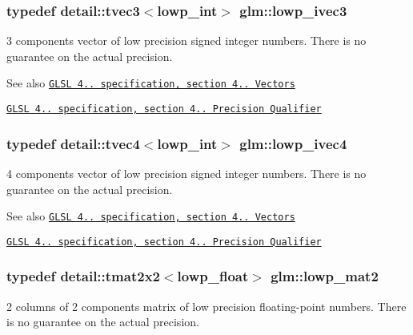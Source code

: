 \subsubsection[{lowp\+\_\+ivec3}]{\setlength{\rightskip}{0pt plus 5cm}typedef detail\+::tvec3$<$lowp\+\_\+int$>$ {\bf glm\+::lowp\+\_\+ivec3}}\label{group__core__precision_ga61fed1e59be72903080596ebbaf2fac5}
3 components vector of low precision signed integer numbers. There is no guarantee on the actual precision.

\begin{DoxySeeAlso}{See also}
\href{http://www.opengl.org/registry/doc/GLSLangSpec.4.20.8.pdf}{\tt G\+L\+S\+L 4.. specification, section 4.. Vectors} 

\href{http://www.opengl.org/registry/doc/GLSLangSpec.4.20.8.pdf}{\tt G\+L\+S\+L 4.. specification, section 4.. Precision Qualifier} 
\end{DoxySeeAlso}
\hypertarget{group__core__precision_gaf6a3d7f4b43a36e905511bc0753e3158}{}
\subsubsection[{lowp\+\_\+ivec4}]{\setlength{\rightskip}{0pt plus 5cm}typedef detail\+::tvec4$<$lowp\+\_\+int$>$ {\bf glm\+::lowp\+\_\+ivec4}}\label{group__core__precision_gaf6a3d7f4b43a36e905511bc0753e3158}
4 components vector of low precision signed integer numbers. There is no guarantee on the actual precision.

\begin{DoxySeeAlso}{See also}
\href{http://www.opengl.org/registry/doc/GLSLangSpec.4.20.8.pdf}{\tt G\+L\+S\+L 4.. specification, section 4.. Vectors} 

\href{http://www.opengl.org/registry/doc/GLSLangSpec.4.20.8.pdf}{\tt G\+L\+S\+L 4.. specification, section 4.. Precision Qualifier} 
\end{DoxySeeAlso}
\hypertarget{group__core__precision_ga403348153f5cd7bd52598be409afdf47}{}
\subsubsection[{lowp\+\_\+mat2}]{\setlength{\rightskip}{0pt plus 5cm}typedef detail\+::tmat2x2$<$lowp\+\_\+float$>$ {\bf glm\+::lowp\+\_\+mat2}}\label{group__core__precision_ga403348153f5cd7bd52598be409afdf47}
2 columns of 2 components matrix of low precision floating-\/point numbers. There is no guarantee on the actual precision.

